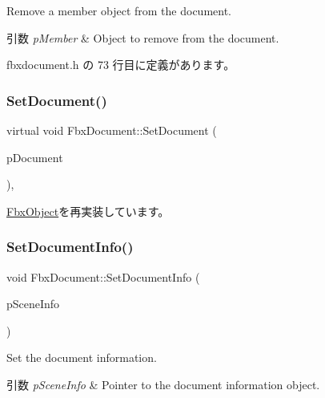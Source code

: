 Remove a member object from the document. 
\begin{DoxyParams}{引数}
{\em p\+Member} & Object to remove from the document. \\
\hline
\end{DoxyParams}


 fbxdocument.\+h の 73 行目に定義があります。

\mbox{\label{class_fbx_document_a063190c324b6fb999b4ac2a1169c2aab}} 
\subsubsection{\texorpdfstring{Set\+Document()}{SetDocument()}}
{\footnotesize\ttfamily virtual void Fbx\+Document\+::\+Set\+Document (\begin{DoxyParamCaption}\item[{\hyperlink{class_fbx_document}{Fbx\+Document} $\ast$}]{p\+Document }\end{DoxyParamCaption})\hspace{0.3cm}{\ttfamily [protected]}, {\ttfamily [virtual]}}



\hyperlink{class_fbx_object_a5f01a45e03bbf2c243ae9ef71d9050cf}{Fbx\+Object}を再実装しています。

\mbox{\label{class_fbx_document_a6dafa0189db8b2088dc46965b210d613}} 
\subsubsection{\texorpdfstring{Set\+Document\+Info()}{SetDocumentInfo()}}
{\footnotesize\ttfamily void Fbx\+Document\+::\+Set\+Document\+Info (\begin{DoxyParamCaption}\item[{\hyperlink{class_fbx_document_info}{Fbx\+Document\+Info} $\ast$}]{p\+Scene\+Info }\end{DoxyParamCaption})}

Set the document information. 
\begin{DoxyParams}{引数}
{\em p\+Scene\+Info} & Pointer to the document information object. \\
\hline
\end{DoxyParams}
\mbox{\label{class_fbx_document_aff0bbbef68acec40c0a2d49a98021f0a}} 
